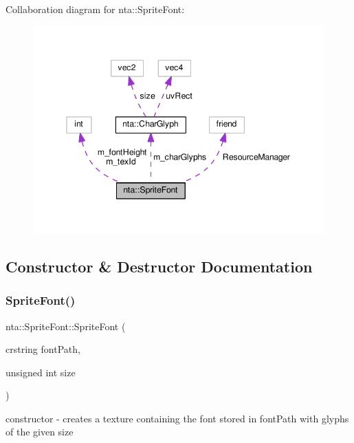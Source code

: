 Collaboration diagram for nta\+:\+:Sprite\+Font\+:\nopagebreak
\begin{figure}[H]
\begin{center}
\leavevmode
\includegraphics[width=345pt]{da/dda/classnta_1_1SpriteFont__coll__graph}
\end{center}
\end{figure}


\subsection{Constructor \& Destructor Documentation}
\mbox{\label{classnta_1_1SpriteFont_a9dc96f31efd0830dcb476ea87534e358}} 
\subsubsection{\texorpdfstring{Sprite\+Font()}{SpriteFont()}}
{\footnotesize\ttfamily nta\+::\+Sprite\+Font\+::\+Sprite\+Font (\begin{DoxyParamCaption}\item[{crstring}]{font\+Path,  }\item[{unsigned int}]{size }\end{DoxyParamCaption})\hspace{0.3cm}{\ttfamily [private]}}



constructor -\/ creates a texture containing the font stored in font\+Path with glyphs of the given size 

